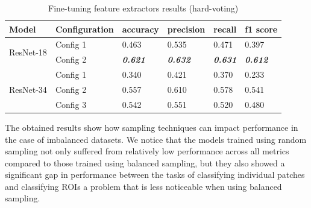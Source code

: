 \documentclass[
11pt, %
english, %
singlespacing, %
headsepline, %
]{project_structure}
\begin{document}
\begin{table}[H]
\centering
\label{tab:resnet_hyperparameters}
\begin{tabular}{@{}llllll@{}}
\toprule
\textbf{Model} & \textbf{Configuration} & \textbf{accuracy} & \textbf{precision} & \textbf{recall} & \textbf{f1 score} \\
\midrule
\multirow{2}{*}{\acrshort{ResNet}-18} & \multicolumn{1}{l}{\acrshort{Config} 1} & \multicolumn{1}{l}{0.463} & \multicolumn{1}{l}{0.535} & \multicolumn{1}{l}{0.471} & \multicolumn{1}{l}{0.397} \\
 & \multicolumn{1}{l}{\acrshort{Config} 2} & \multicolumn{1}{l}{\textbf{\textit{0.621}}} & \multicolumn{1}{l}{\textbf{\textit{0.632}}} & \multicolumn{1}{l}{\textbf{\textit{0.631}}} & \multicolumn{1}{l}{\textbf{\textit{0.612}}} \\
 \midrule
 \multirow{3}{*}{\acrshort{ResNet}-34} & \multicolumn{1}{l}{\acrshort{Config} 1} & \multicolumn{1}{l}{0.340} & \multicolumn{1}{l}{0.421} & \multicolumn{1}{l}{0.370} & \multicolumn{1}{l}{0.233} \\
 & \multicolumn{1}{l}{\acrshort{Config} 2} & \multicolumn{1}{l}{0.557} & \multicolumn{1}{l}{0.610} & \multicolumn{1}{l}{0.578} & \multicolumn{1}{l}{0.541} \\
 & \multicolumn{1}{l}{\acrshort{Config} 3} & \multicolumn{1}{l}{0.542} & \multicolumn{1}{l}{0.551} & \multicolumn{1}{l}{0.520} & \multicolumn{1}{l}{0.480} \\
\bottomrule

\end{tabular}
\caption{Fine-tuning feature extractors results (hard-voting)}
\label{tab:fine_tuning_results_rois_hard}
\end{table}


\noindent The obtained results show how sampling techniques can impact performance in the case of imbalanced datasets. We notice that the models trained using random sampling not only suffered from relatively low performance across all metrics compared to those trained using balanced sampling, but they also showed a significant gap in performance between the tasks of classifying individual patches and classifying \acrshort{ROI}s a problem that is less noticeable when using balanced sampling.\\
\end{document}
